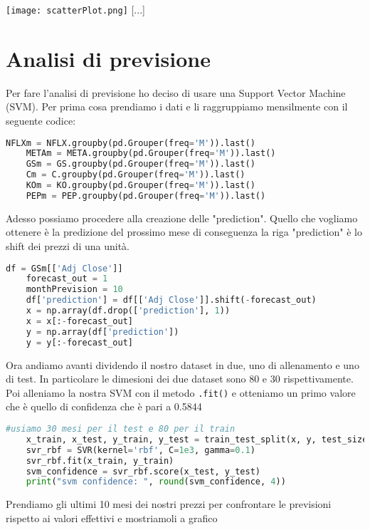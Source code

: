 \documentclass{report}
\begin{document}
\texttt{[image: scatterPlot.png]}
[...]
\chapter{Analisi di previsione}
Per fare l'analisi di previsione ho deciso di usare una Support Vector Machine (SVM). Per prima cosa prendiamo i dati e li raggruppiamo mensilmente con il seguente codice:
\begin{lstlisting}[language=python]
    NFLXm = NFLX.groupby(pd.Grouper(freq='M')).last()
    METAm = META.groupby(pd.Grouper(freq='M')).last()
    GSm = GS.groupby(pd.Grouper(freq='M')).last()
    Cm = C.groupby(pd.Grouper(freq='M')).last()
    KOm = KO.groupby(pd.Grouper(freq='M')).last()
    PEPm = PEP.groupby(pd.Grouper(freq='M')).last()
\end{lstlisting}
Adesso possiamo procedere alla creazione delle "prediction". Quello che vogliamo ottenere è la predizione del prossimo mese di conseguenza la riga "prediction" è lo shift dei prezzi di una unità.

\begin{lstlisting}[language=python]
    df = GSm[['Adj Close']]
    forecast_out = 1
    monthPrevision = 10
    df['prediction'] = df[['Adj Close']].shift(-forecast_out)
    x = np.array(df.drop(['prediction'], 1))
    x = x[:-forecast_out]
    y = np.array(df['prediction'])
    y = y[:-forecast_out]
\end{lstlisting}

Ora andiamo avanti dividendo il nostro dataset in due, uno di allenamento e uno di test. In particolare le dimesioni dei due dataset sono 80 e 30 rispettivamente. Poi alleniamo la nostra SVM con il metodo \lstinline{.fit()} e otteniamo un primo valore che è quello di confidenza che è pari a \num{0.5844}

\begin{lstlisting}[language=python]
    #usiamo 30 mesi per il test e 80 per il train
    x_train, x_test, y_train, y_test = train_test_split(x, y, test_size=30, train_size=80)
    svr_rbf = SVR(kernel='rbf', C=1e3, gamma=0.1)
    svr_rbf.fit(x_train, y_train)
    svm_confidence = svr_rbf.score(x_test, y_test)
    print("svm confidence: ", round(svm_confidence, 4))
\end{lstlisting}

Prendiamo gli ultimi 10 mesi dei nostri prezzi per confrontare le previsioni rispetto ai valori effettivi e mostriamoli a grafico
\end{document}
